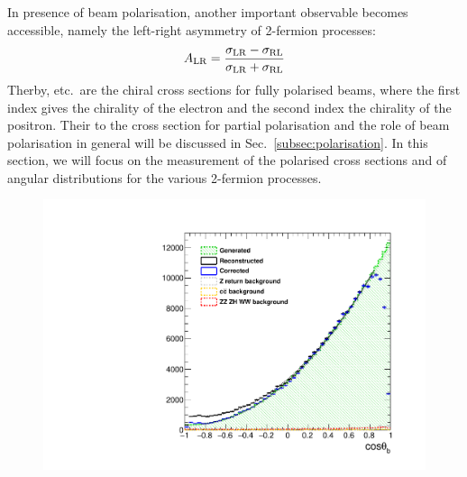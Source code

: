 In presence of beam polarisation, another important observable becomes accessible, namely the left-right asymmetry of 2-fermion processes:
\begin{equation}
A_{\mathrm{LR}} = \frac{\sigma_{\mathrm{LR}}-\sigma_{\mathrm{RL}}}{\sigma_{\mathrm{LR}}+\sigma_{\mathrm{RL}}}
\label{eq:defALR}
\end{equation}
Therby, \sigmaLR etc.\ are the chiral cross sections for fully polarised beams, where the first index gives the chirality of the electron and the second index the chirality of the positron. Their to the cross section for partial polarisation and the role of beam polarisation in general will be discussed in Sec.~\ref{subsec:polarisation}. In this section, we will focus on the measurement of
the polarised cross sections and of angular distributions for the various 2-fermion processes.

\begin{figure}[hbt]
       \includegraphics[width=0.45\linewidth]{./chapters/figures/basymmetry-final-left.pdf}

\end{figure}
